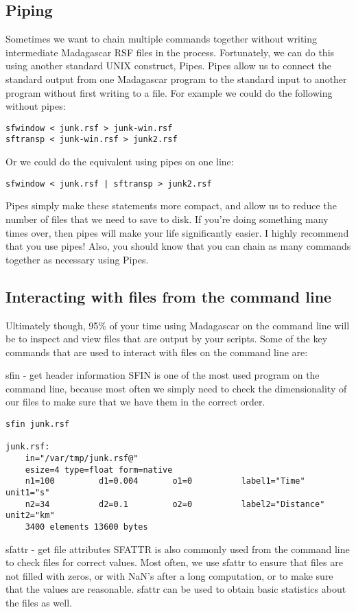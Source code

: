 \subsection{Piping}
Sometimes we want to chain multiple commands together without writing intermediate Madagascar RSF files in the process. Fortunately, we can do this using another standard UNIX construct, Pipes. Pipes allow us to connect the standard output from one Madagascar program to the standard input to another program without first writing to a file. For example we could do the following without pipes:
\begin{verbatim}
sfwindow < junk.rsf > junk-win.rsf
sftransp < junk-win.rsf > junk2.rsf
\end{verbatim}
Or we could do the equivalent using pipes on one line:
\begin{verbatim}
sfwindow < junk.rsf | sftransp > junk2.rsf
\end{verbatim}
Pipes simply make these statements more compact, and allow us to reduce the number of files that we need to save to disk. If you're doing something many times over, then pipes will make your life significantly easier. I highly recommend that you use pipes! Also, you should know that you can chain as many commands together as necessary using Pipes.

\subsection{Interacting with files from the command line}

Ultimately though, 95\% of your time using Madagascar on the command line will be to inspect and view files that are output by your scripts. Some of the key commands that are used to interact with files on the command line are:

sfin - get header information
SFIN is one of the most used program on the command line, because most often we simply need to check the dimensionality of our files to make sure that we have them in the correct order.
\begin{verbatim}
sfin junk.rsf
 
junk.rsf:
    in="/var/tmp/junk.rsf@"
    esize=4 type=float form=native 
    n1=100         d1=0.004       o1=0          label1="Time" unit1="s" 
    n2=34          d2=0.1         o2=0          label2="Distance" unit2="km" 
	3400 elements 13600 bytes
\end{verbatim}

sfattr - get file attributes
SFATTR is also commonly used from the command line to check files for correct values. Most often, we use sfattr to ensure that files are not filled with zeros, or with NaN's after a long computation, or to make sure that the values are reasonable. sfattr can be used to obtain basic statistics about the files as well.

